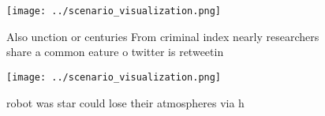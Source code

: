 \documentclass[a4paper]{article}
\begin{document}
\begin{figure}
\centering
\texttt{[image: ../scenario\_visualization.png]}
\caption{Also unction or centuries From criminal index nearly researchers share a common eature o twitter is retweetin
}
\end{figure}
 
\begin{figure}
\centering
\texttt{[image: ../scenario\_visualization.png]}
\caption{robot was star could lose their atmospheres via h
}
\end{figure}
 
\end{document}
